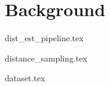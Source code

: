 \section{Background}

{dist_est_pipeline.tex}
\clearpage

{distance_sampling.tex}
\clearpage

{dataset.tex}
\clearpage
